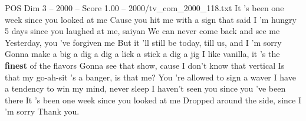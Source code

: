 \begin{textsample}{POS Dim 3 – 2000 – Score 1.00 – 2000/tv\_com\_2000\_118.txt}  \label{ex:f3_pos_084}
It 's been one week since you looked at me Cause you hit me with a sign that said I 'm hungry 5 days since you laughed at me, saiyan We can never come back and see me Yesterday, you 've forgiven me But it 'll still be today, till us, and I 'm sorry Gonna make a big a dig a dig a lick a stick a dig a jig I like vanilla, it 's the \textbf{finest} of the flavors Gonna see that show, cause I don't know that vertical Is that my go-ah-sit 's a banger, is that me?
You 're allowed to sign a waver I have a tendency to win my mind, never sleep I haven't seen you since you 've been there It 's been one week since you looked at me Dropped around the side, since I 'm sorry Thank you.

\end{textsample}
